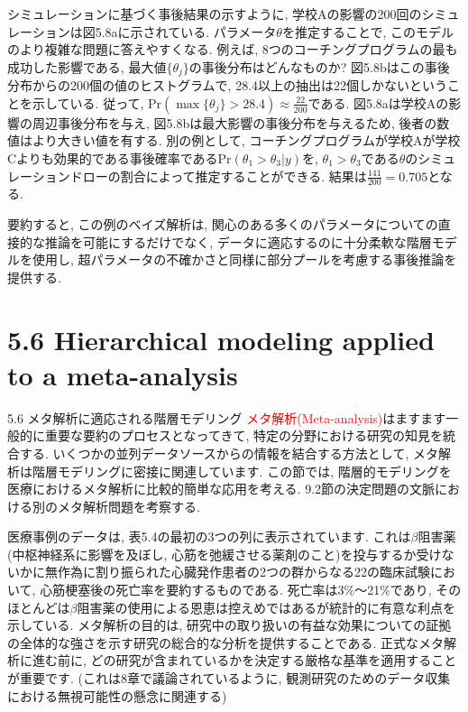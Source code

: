 \documentclass[10pt,dvipdfmx,a4]{beamer}
\newcommand{\tcr}[1]{\textcolor{red}{#1}}
\begin{document}

\begin{frame}
シミュレーションに基づく事後結果の示すように, 学校Aの影響の200回のシミュレーションは図5.8aに示されている.
パラメータ$\theta$を推定することで, このモデルのより複雑な問題に答えやすくなる.
例えば, 8つのコーチングプログラムの最も成功した影響である, 最大値$\{\theta_j\}$の事後分布はどんなものか?
図5.8bはこの事後分布からの200個の値のヒストグラムで, 28.4以上の抽出は22個しかないということを示している.
従って, $\text{Pr}(\max\{\theta_j\}>28.4)\approx  \tfrac{22}{200}$である.
図5.8aは学校Aの影響の周辺事後分布を与え, 図5.8bは最大影響の事後分布を与えるため, 後者の数値はより大きい値を有する.
別の例として, コーチングプログラムが学校Aが学校Cよりも効果的である事後確率である$\text{Pr}(\theta_1>\theta_3|y)$を, $\theta_1>\theta_3$である$\theta$のシミュレーションドローの割合によって推定することができる.
結果は$\tfrac{141}{200}=0.705$となる.

要約すると, この例のベイズ解析は, 関心のある多くのパラメータについての直接的な推論を可能にするだけでなく, データに適応するのに十分柔軟な階層モデルを使用し, 超パラメータの不確かさと同様に部分プールを考慮する事後推論を提供する.
\end{frame}

\section{5.6 Hierarchical modeling applied to a meta-analysis}
\begin{frame}{5.6 メタ解析に適応される階層モデリング}
\tcr{メタ解析(Meta-analysis)}はますます一般的に重要な要約のプロセスとなってきて, 特定の分野における研究の知見を統合する.
いくつかの並列データソースからの情報を結合する方法として, メタ解析は階層モデリングに密接に関連しています.
この節では, 階層的モデリングを医療におけるメタ解析に比較的簡単な応用を考える.
9.2節の決定問題の文脈における別のメタ解析問題を考察する.

医療事例のデータは, 表5.4の最初の3つの列に表示されています.
これは$\beta$阻害薬(中枢神経系に影響を及ぼし, 心筋を弛緩させる薬剤のこと)を投与するか受けないかに無作為に割り振られた心臓発作患者の2つの群からなる22の臨床試験において, 心筋梗塞後の死亡率を要約するものである.
死亡率は3\%～21\%であり, そのほとんどは$\beta$阻害薬の使用による恩恵は控えめではあるが統計的に有意な利点を示している.
メタ解析の目的は, 研究中の取り扱いの有益な効果についての証拠の全体的な強さを示す研究の総合的な分析を提供することである.
正式なメタ解析に進む前に, どの研究が含まれているかを決定する厳格な基準を適用することが重要です.
(これは8章で議論されているように, 観測研究のためのデータ収集における無視可能性の懸念に関連する)
\end{frame}
\end{document}
